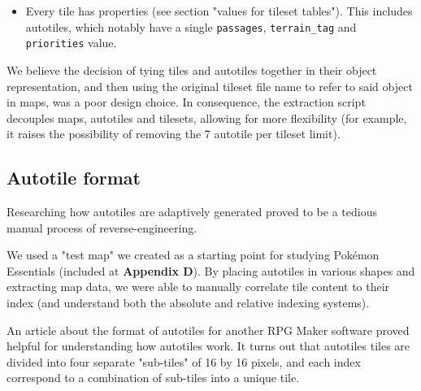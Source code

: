 \documentclass[11pt]{article}
\begin{document}
{\begin{itemize}
	This property is generated at the moment of placing the autotiles by automatically determining the right index for each, and therefore is an artifact of the map editor.
	
	Two formats were identified (\textit{frames are situated side-by-side horizontally}) :
	\begin{itemize}
		\item $3N \times 4$ : a 3 tile horizontal, 4 tile vertical, $N$ frame image. This is the official autotile format for RPG Maker XP.
		
		\item $N \times 1$ : a 1 tile horizontal, 1 tile vertical, $N$ frame image. This is used for animated individual tiles.
	\end{itemize}

	Animation is produced by iterating over frames of an autotile each time the screen is drawn.
	
	\item Every tile has properties (see section "values for tileset tables"). This includes autotiles, which notably have a single \verb|passages|, \verb|terrain_tag| and \verb|priorities| value.
\end{itemize}


We believe the decision of tying tiles and autotiles together in their object representation, and then using the original tileset file name to refer to said object in maps, was a poor design choice. In consequence, the extraction script decouples maps, autotiles and tilesets, allowing for more flexibility (for example, it raises the possibility of removing the 7 autotile per tileset limit).



\subsection{Autotile format}

Researching how autotiles are adaptively generated proved to be a tedious manual process of reverse-engineering. 

We used a "test map" we created as a starting point for studying Pokémon Essentials (included at \textbf{Appendix D}). By placing autotiles in various shapes and extracting map data, we were able to manually correlate tile content to their index (and understand both the absolute and relative indexing systems).

An article about the format of autotiles for another RPG Maker software \cite{Autotile} proved helpful for understanding how autotiles work. It turns out that autotiles tiles are divided into four separate "sub-tiles" of 16 by 16 pixels, and each index correspond to a combination of sub-tiles into a unique tile.

}
\end{document}
